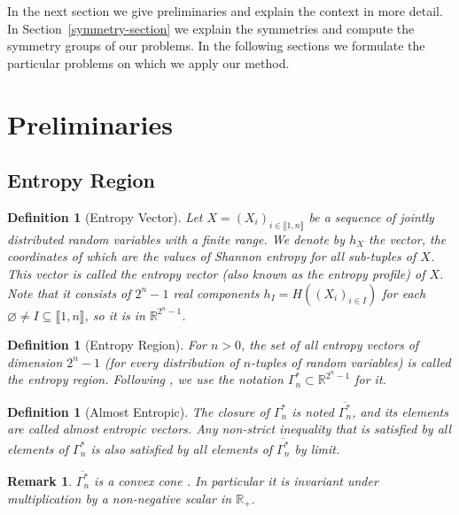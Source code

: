 \documentclass[11pt, a4paper]{kybernetika}
\newtheorem{remark}[theorem]{Remark}
\newtheorem{definition}[theorem]{Definition}
\begin{document}
	In the next section we give preliminaries and explain the context in more detail. In Section~\ref{symmetry-section} we explain the symmetries and compute the symmetry groups of our problems. In the following sections we formulate the particular problems on which we apply our method.
	
	\section{Preliminaries}\label{ch:preliminaries}
	
	\subsection{Entropy Region}
	
	\begin{definition}[Entropy Vector]
		Let $X=(X_i)_{i\in\llbracket1,n\rrbracket}$ be a sequence of jointly distributed random variables with a finite range. We denote by $h_X$ the vector, the coordinates of which are the values of Shannon entropy for all sub-tuples of $X$. This vector is called the \emph{entropy vector} (also known as \emph{the entropy profile}) of $X$. Note that it consists of $2^n-1$ real components $h_I=H((X_i)_{i\in I})$ for each ${\varnothing\neq I\subseteq\llbracket1,n\rrbracket}$, so it is in $\mathbb{R}^{2^n-1}$.
	\end{definition}
	
	\begin{definition}[Entropy Region]
		For $n>0$, the set of all entropy vectors of dimension $2^n-1$ (for every distribution of $n$-tuples of random variables) is called the \emph{entropy region}. Following \cite{zhang1998characterization}, we use the notation $\Gamma_n^*\subset\mathbb{R}^{2^n-1}$ for it.
	\end{definition}
	
	\begin{definition}[Almost Entropic]
		The closure of $\Gamma_n^*$ is noted $\overline{\Gamma_n^*}$, and its elements are called \emph{almost entropic} vectors. Any non-strict inequality that is satisfied by all elements of $\Gamma_n^*$ is also satisfied by all elements of $\overline{\Gamma_n^*}$ by limit.
	\end{definition}
	
	\begin{remark}\label{rem:convex-cone}
		$\overline{\Gamma_n^*}$ is a convex cone \cite{zhang1997non}. In particular it is invariant under multiplication by a non-negative scalar in $\mathbb{R}_+$.
	\end{remark}
	
\end{document}
